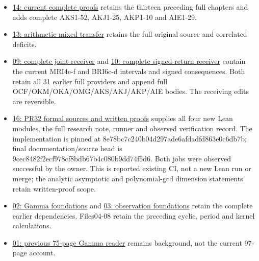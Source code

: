 \documentclass[
]{article}
\providecommand{\tightlist}{%
  \setlength{\itemsep}{0pt}\setlength{\parskip}{0pt}}
\begin{document}
\begin{itemize}
\tightlist
\item
  \href{https://github.com/KokunoYumeto/zeta-function-research-reader/blob/main/workbenches/splitzero-tandem/continuations/20260914-conductor-kernel-continuation/14_CURRENT_KERNEL_AND_MULTIPLICITY_PROOFS.tex}{14:
  current complete proofs} retains the thirteen preceding full chapters
  and adds complete AKS1-52, AKJ1-25, AKP1-10 and AIE1-29.
\item
  \href{https://github.com/KokunoYumeto/zeta-function-research-reader/blob/main/workbenches/splitzero-tandem/continuations/20260914-conductor-kernel-continuation/13_ARITHMETIC_MIXED_TRANSFER.tex}{13:
  arithmetic mixed transfer} retains the full original source and
  correlated deficits.
\item
  \href{https://github.com/KokunoYumeto/zeta-function-research-reader/blob/main/workbenches/splitzero-tandem/continuations/20260914-conductor-kernel-continuation/09_UPDATED_JOINT_NOTE.tex}{09:
  complete joint receiver} and
  \href{https://github.com/KokunoYumeto/zeta-function-research-reader/blob/main/workbenches/splitzero-tandem/continuations/20260914-conductor-kernel-continuation/10_UPDATED_SIGNED_RETURN.tex}{10:
  complete signed-return receiver} contain the current MRI4e-f and
  BRI6c-d intervals and signed consequences. Both retain all 31 earlier
  full providers and append full OCF/OKM/OKA/OMG/AKS/AKJ/AKP/AIE bodies.
  The receiving edits are reversible.
\item
  \href{https://github.com/KokunoYumeto/zeta-function-research-reader/blob/main/workbenches/splitzero-tandem/continuations/20260914-conductor-kernel-continuation/16_PR32_FORMAL_SOURCE_AND_PROOFS.md}{16:
  PR32 formal sources and written proofs} supplies all four new Lean
  modules, the full research note, runner and observed verification
  record. The implementation is pinned at
  8e78bc7c240b04d297ade6afdadfd863e0c6db7b; final documentation/source
  head is 9cec8482f2ecf978cf8bdb67b4c080b9dd74f5d6. Both jobs were
  observed successful by the owner. This is reported existing CI, not a
  new Lean run or merge; the analytic asymptotic and polynomial-gcd
  dimension statements retain written-proof scope.
\item
  \href{https://github.com/KokunoYumeto/zeta-function-research-reader/blob/main/workbenches/splitzero-tandem/continuations/20260914-conductor-kernel-continuation/02_FULL_GAMMA_PROOFS.tex}{02:
  Gamma foundations} and
  \href{https://github.com/KokunoYumeto/zeta-function-research-reader/blob/main/workbenches/splitzero-tandem/continuations/20260914-conductor-kernel-continuation/03_FULL_OBSERVATION_PROOFS.tex}{03:
  observation foundations} retain the complete earlier dependencies.
  Files04-08 retain the preceding cyclic, period and kernel
  calculations.
\item
  \href{https://github.com/KokunoYumeto/zeta-function-research-reader/blob/main/workbenches/splitzero-tandem/continuations/20260914-conductor-kernel-continuation/01_GAMMA_READER.pdf}{01:
  previous 75-page Gamma reader} remains background, not the current
  97-page account.
\end{itemize}
\end{document}
